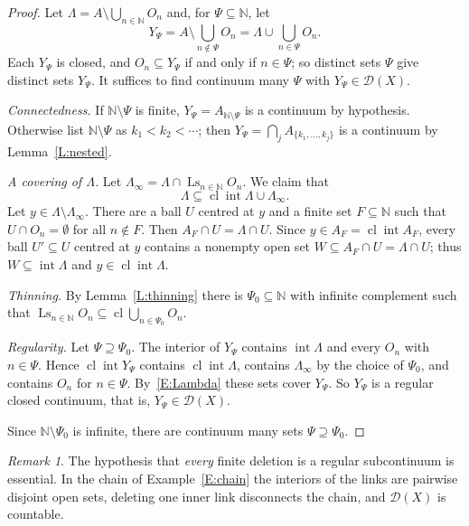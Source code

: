 \documentclass[11pt,reqno]{amsart}
\theoremstyle{plain}
\theoremstyle{definition}
\theoremstyle{remark}
\newtheorem{remark}[theorem]{Remark}
\newcommand{\D}{\mathcal{D}}
\newcommand{\cl}{\operatorname{cl}}
\newcommand{\intr}{\operatorname{int}}
\newcommand{\Ls}{\operatorname{Ls}}
\newcommand{\N}{\mathbb{N}}
\begin{document}
\begin{proof}
Let $\Lambda=A\setminus\bigcup_{n\in\N}O_n$ and, for $\Psi\subseteq\N$, let
\[
Y_\Psi=A\setminus\bigcup_{n\notin\Psi}O_n=\Lambda\cup\bigcup_{n\in\Psi}O_n .
\]
Each $Y_\Psi$ is closed, and $O_n\subseteq Y_\Psi$ if and only if $n\in\Psi$; so distinct sets $\Psi$ give distinct sets $Y_\Psi$. It suffices to find continuum many $\Psi$ with $Y_\Psi\in\D(X)$.

\emph{Connectedness.} If $\N\setminus\Psi$ is finite, $Y_\Psi=A_{\N\setminus\Psi}$ is a continuum by hypothesis. Otherwise list $\N\setminus\Psi$ as $k_1<k_2<\cdots$; then $Y_\Psi=\bigcap_jA_{\{k_1,\dots,k_j\}}$ is a continuum by Lemma~\ref{L:nested}.

\emph{A covering of $\Lambda$.} Let $\Lambda_\infty=\Lambda\cap\Ls_{n\in\N}O_n$. We claim that
\begin{equation}\label{E:Lambda}
\Lambda\subseteq\cl\intr\Lambda\cup\Lambda_\infty .
\end{equation}
Let $y\in\Lambda\setminus\Lambda_\infty$. There are a ball $U$ centred at $y$ and a finite set $F\subseteq\N$ such that $U\cap O_n=\emptyset$ for all $n\notin F$. Then $A_F\cap U=\Lambda\cap U$. Since $y\in A_F=\cl\intr A_F$, every ball $U'\subseteq U$ centred at $y$ contains a nonempty open set $W\subseteq A_F\cap U=\Lambda\cap U$; thus $W\subseteq\intr\Lambda$ and $y\in\cl\intr\Lambda$.

\emph{Thinning.} By Lemma~\ref{L:thinning} there is $\Psi_0\subseteq\N$ with infinite complement such that $\Ls_{n\in\N}O_n\subseteq\cl\bigcup_{n\in\Psi_0}O_n$.

\emph{Regularity.} Let $\Psi\supseteq\Psi_0$. The interior of $Y_\Psi$ contains $\intr\Lambda$ and every $O_n$ with $n\in\Psi$. Hence $\cl\intr Y_\Psi$ contains $\cl\intr\Lambda$, contains $\Lambda_\infty$ by the choice of $\Psi_0$, and contains $O_n$ for $n\in\Psi$. By~\eqref{E:Lambda} these sets cover $Y_\Psi$. So $Y_\Psi$ is a regular closed continuum, that is, $Y_\Psi\in\D(X)$.

Since $\N\setminus\Psi_0$ is infinite, there are continuum many sets $\Psi\supseteq\Psi_0$.
\end{proof}

\begin{remark}
The hypothesis that \emph{every} finite deletion is a regular subcontinuum is essential. In the chain of Example~\ref{E:chain} the interiors of the links are pairwise disjoint open sets, deleting one inner link disconnects the chain, and $\D(X)$ is countable.
\end{remark}
\end{document}
